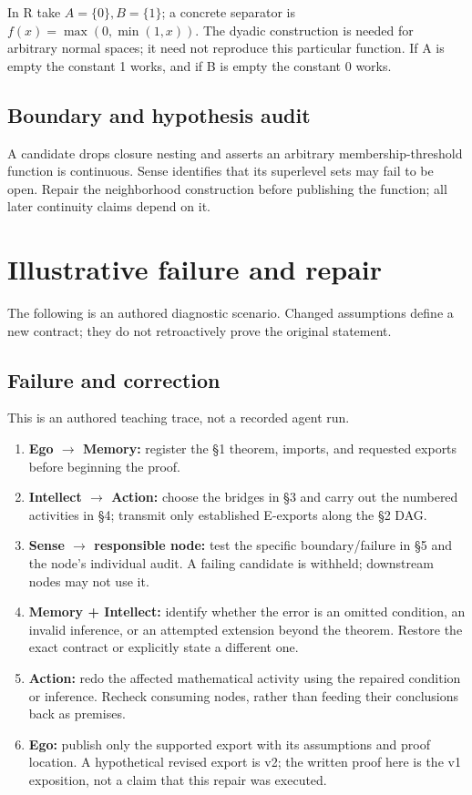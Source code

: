 \documentclass[preprint,12pt,aps,pra,showkeys,amsmath,amssymb,superscriptaddress,floatfix]{revtex4-2}
\theoremstyle{definition}
\theoremstyle{remark}
\providecommand{\tightlist}{\setlength{\itemsep}{2pt}\setlength{\parskip}{0pt}}
\begin{document}
In R take \(A=\{0\},B=\{1\}\); a concrete separator is
\(f(x)=\operatorname{max} (0,\operatorname{min} (1,x))\). The dyadic
construction is needed for arbitrary normal spaces; it need not
reproduce this particular function. If A is empty the constant 1 works,
and if B is empty the constant 0 works.

\subsection{Boundary and hypothesis audit}

A candidate drops closure nesting and asserts an arbitrary
membership-threshold function is continuous. Sense identifies that its
superlevel sets may fail to be open. Repair the neighborhood
construction before publishing the function; all later continuity claims
depend on it.

\section{Illustrative failure and repair}

The following is an authored diagnostic scenario. Changed assumptions
define a new contract; they do not retroactively prove the original
statement.

\subsection{Failure and correction}
This is an authored teaching trace, not a recorded agent run.

\begin{enumerate}
\def\labelenumi{\arabic{enumi}.}
\tightlist
\item
  \textbf{Ego \(\to\) Memory:} register the §1 theorem, imports, and
  requested exports before beginning the proof.
\item
  \textbf{Intellect \(\to\) Action:} choose the bridges in §3 and carry
  out the numbered activities in §4; transmit only established E-exports
  along the §2 DAG.
\item
  \textbf{Sense \(\to\) responsible node:} test the specific
  boundary/failure in §5 and the node's individual audit. A failing
  candidate is withheld; downstream nodes may not use it.
\item
  \textbf{Memory + Intellect:} identify whether the error is an omitted
  condition, an invalid inference, or an attempted extension beyond the
  theorem. Restore the exact contract or explicitly state a different
  one.
\item
  \textbf{Action:} redo the affected mathematical activity using the
  repaired condition or inference. Recheck consuming nodes, rather than
  feeding their conclusions back as premises.
\item
  \textbf{Ego:} publish only the supported export with its assumptions
  and proof location. A hypothetical revised export is v2; the written
  proof here is the v1 exposition, not a claim that this repair was
  executed.
\end{enumerate}
\end{document}
